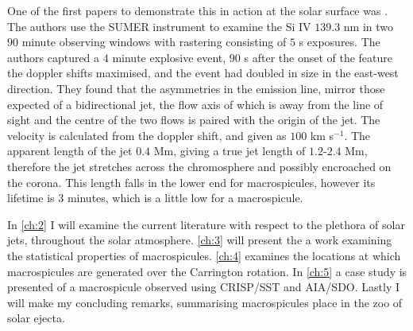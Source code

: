 One of the first papers to demonstrate this in action at the solar surface was \cite{Innes1997}.
The authors use the SUMER instrument to examine the Si IV $139.3$ nm in two $90$ minute observing windows with rastering consisting of $5$ s exposures.
The authors captured a $4$ minute explosive event, $90$ s after the onset of the feature the doppler shifts maximised, and the event had doubled in size in the east-west direction.
They found that the asymmetries in the emission line, mirror those expected of a bidirectional jet, the flow axis of which is away from the line of sight and the centre of the two flows is paired with the origin of the jet.
The velocity is calculated from the doppler shift, and given as $100$ km s$^{-1}$.
The apparent length of the jet $0.4$ Mm, giving a true jet length of $1.2$-$2.4$ Mm, therefore the jet stretches across the chromosphere and possibly encroached on the corona.
This length falls in the lower end for macrospicules, however its lifetime is $3$ minutes, which is a little low for a macrospicule.

In \ref{ch:2} I will examine the current literature with respect to the plethora of solar jets, throughout the solar atmosphere.
\ref{ch:3} will present the a work examining the statistical properties of macrospicules.
\ref{ch:4} examines the locations at which macrospicules are generated over the Carrington rotation.
In \ref{ch:5} a case study is presented of a macrospicule observed using CRISP/SST and AIA/SDO.
Lastly I will make my concluding remarks, summarising macrospicules place in the zoo of solar ejecta.


